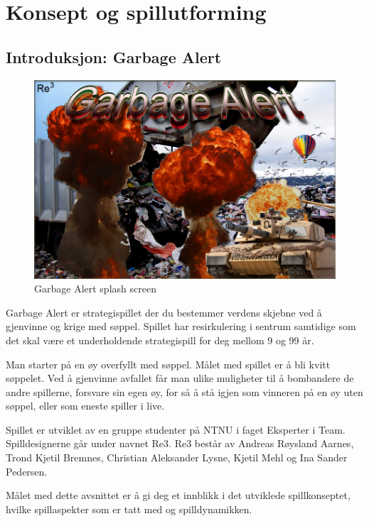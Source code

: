 \section{Konsept og spillutforming}\label{sec:konsept}

\subsection{Introduksjon: Garbage Alert}

			\begin{figure} [here]
				\begin{center}
					\includegraphics[scale=0.5]{images/splashscreen}
				\end{center}
			\caption{Garbage Alert splash screen}
		\end{figure}

Garbage Alert er strategispillet der du bestemmer verdens skjebne ved å gjenvinne og krige med søppel. Spillet har resirkulering i sentrum samtidige som det skal være et underholdende strategispill for deg mellom 9 og 99 år. 

Man starter på en øy overfyllt med søppel. Målet med spillet er å bli kvitt søppelet. Ved å gjenvinne avfallet får man ulike muligheter til å bombandere de andre spillerne, forsvare sin egen øy, for så å stå igjen som vinneren på en øy uten søppel, eller som eneste spiller i live.

Spillet er utviklet av en gruppe studenter på NTNU i faget Eksperter i Team. Spilldesignerne går under navnet Re3. Re3 består av Andreas Røysland Aarnes, Trond Kjetil Bremnes, Christian Aleksander Lysne, Kjetil Mehl og Ina Sander Pedersen.

Målet med dette avsnittet er å gi deg et innblikk i det utviklede spillkonseptet,
hvilke spillaspekter som er tatt med og spilldynamikken.

